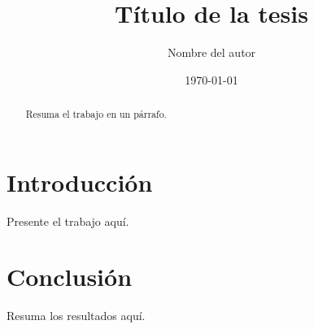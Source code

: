 \documentclass[12pt]{report}
\title{Título de la tesis}
\author{Nombre del autor}
\date{\today}
\begin{document}
\maketitle

\begin{abstract}
Resuma el trabajo en un párrafo.
\end{abstract}

\tableofcontents

\chapter{Introducción}
Presente el trabajo aquí.

\chapter{Conclusión}
Resuma los resultados aquí.
\end{document}
